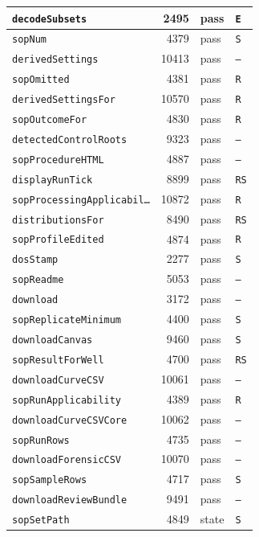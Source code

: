 {\begin{xltabular}{\linewidth}{|l|r|X|X|}
\texttt{decodeSubsets} & 2495 & pass & \texttt{E} \\ \hline
\texttt{sopNum} & 4379 & pass & \texttt{S} \\ \hline
\texttt{derivedSettings} & 10413 & pass & \texttt{--} \\ \hline
\texttt{sopOmitted} & 4381 & pass & \texttt{R} \\ \hline
\texttt{derivedSettingsFor} & 10570 & pass & \texttt{R} \\ \hline
\texttt{sopOutcomeFor} & 4830 & pass & \texttt{R} \\ \hline
\texttt{detectedControlRoots} & 9323 & pass & \texttt{--} \\ \hline
\texttt{sopProcedureHTML} & 4887 & pass & \texttt{--} \\ \hline
\texttt{displayRunTick} & 8899 & pass & \texttt{RS} \\ \hline
\texttt{sopProcessingApplicabil…} & 10872 & pass & \texttt{R} \\ \hline
\texttt{distributionsFor} & 8490 & pass & \texttt{RS} \\ \hline
\texttt{sopProfileEdited} & 4874 & pass & \texttt{R} \\ \hline
\texttt{dosStamp} & 2277 & pass & \texttt{S} \\ \hline
\texttt{sopReadme} & 5053 & pass & \texttt{--} \\ \hline
\texttt{download} & 3172 & pass & \texttt{--} \\ \hline
\texttt{sopReplicateMinimum} & 4400 & pass & \texttt{S} \\ \hline
\texttt{downloadCanvas} & 9460 & pass & \texttt{S} \\ \hline
\texttt{sopResultForWell} & 4700 & pass & \texttt{RS} \\ \hline
\texttt{downloadCurveCSV} & 10061 & pass & \texttt{--} \\ \hline
\texttt{sopRunApplicability} & 4389 & pass & \texttt{R} \\ \hline
\texttt{downloadCurveCSVCore} & 10062 & pass & \texttt{--} \\ \hline
\texttt{sopRunRows} & 4735 & pass & \texttt{--} \\ \hline
\texttt{downloadForensicCSV} & 10070 & pass & \texttt{--} \\ \hline
\texttt{sopSampleRows} & 4717 & pass & \texttt{S} \\ \hline
\texttt{downloadReviewBundle} & 9491 & pass & \texttt{--} \\ \hline
\texttt{sopSetPath} & 4849 & state & \texttt{S} \\ \hline

\end{xltabular}}
